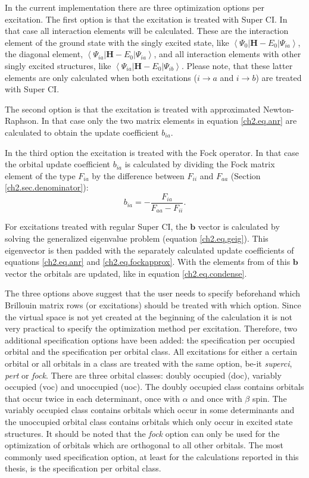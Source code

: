 In the current implementation there are three optimization options per excitation. The first option is that the excitation is treated with Super CI. In that case all interaction elements will be calculated. These are the interaction element of the ground state with the singly excited state, like $\left < \Psi_{0} | \mathbf{H} - E_0 | \Psi_{ia} \right >$, the diagonal element, $\left < \Psi_{ia} | \mathbf{H} - E_0 | \Psi_{ia} \right >$, and all interaction elements with other singly excited structures, like $\left < \Psi_{ia} | \mathbf{H} - E_0 | \Psi_{ib} \right >$. Please note, that these latter elements are only calculated when both excitations ($i \rightarrow a$ and $i \rightarrow b$) are treated with Super CI.

The second option is that the excitation is treated with approximated Newton-Raphson. In that case only the two matrix elements in equation \ref{ch2.eq.anr} are calculated to obtain the update coefficient $b_{ia}$.

In the third option the excitation is treated with the Fock operator. In that case the orbital update coefficient $b_{ia}$ is calculated by dividing the Fock matrix element of the type $F_{ia}$ by the difference between $F_{ii}$ and $F_{aa}$ (Section \ref{ch2.sec.denominator}):
\begin{equation}
b_{ia}= - \frac{F_{ia}}{F_{aa}-F_{ii}}.
\label{ch2.eq.fockapprox}
\end{equation}

For excitations treated with regular Super CI, the $\mathbf{b}$ vector is calculated by solving the generalized eigenvalue problem (equation \ref{ch2.eq.geig}). This eigenvector is then padded with the separately calculated update coefficients of equations \ref{ch2.eq.anr} and \ref{ch2.eq.fockapprox}. With the elements from of this $\mathbf{b}$ vector the orbitals are updated, like in equation \ref{ch2.eq.condense}.

The three options above suggest that the user needs to specify beforehand which Brillouin matrix rows (or excitations) should be treated with which option. Since the virtual space is not yet created at the beginning of the calculation it is not very practical to specify the optimization method per excitation. Therefore, two additional specification options have been added: the specification per occupied orbital and the specification per orbital class. All excitations for either a certain orbital or all orbitals in a class are treated with the same option, be-it \textit{superci}, \textit{pert} or \textit{fock}. There are three orbital classes: doubly occupied (doc), variably occupied (voc) and unoccupied (uoc). The doubly occupied class contains orbitals that occur twice in each determinant, once with $\alpha$ and once with $\beta$ spin. The variably occupied class contains orbitals which occur in some determinants and the unoccupied orbital class contains orbitals which only occur in excited state structures. It should be noted that the \textit{fock} option can only be used for the optimization of orbitals which are orthogonal to all other orbitals. The most commonly used specification option, at least for the calculations reported in this thesis, is the specification per orbital class. 

